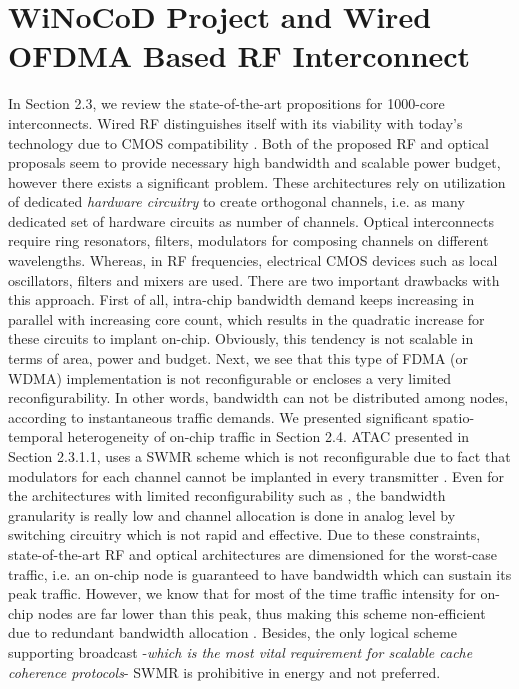 \chapter{WiNoCoD Project and Wired OFDMA Based RF Interconnect } %

\label{Chapter3} %


In Section 2.3, we review the state-of-the-art propositions for 1000-core interconnects. Wired RF distinguishes itself with its viability with today's technology due to CMOS compatibility \cite{chang2008cmp}. Both of the proposed RF and optical proposals seem to provide necessary high bandwidth and scalable power budget, however there exists a significant problem. These architectures rely on utilization of dedicated \textit{hardware circuitry} to create orthogonal channels, i.e. as many dedicated set of hardware circuits as number of channels. Optical interconnects require ring resonators, filters, modulators for composing channels on different wavelengths. Whereas, in RF frequencies, electrical CMOS devices such as local oscillators, filters and mixers are used. There are two important drawbacks with this approach. First of all, intra-chip bandwidth demand keeps increasing in parallel with increasing core count, which results in the quadratic increase for these circuits to implant on-chip. Obviously, this tendency is not scalable in terms of area, power and budget. Next, we see that this type of FDMA (or WDMA) implementation is not reconfigurable or encloses a very limited reconfigurability. In other words, bandwidth can not be distributed among nodes, according to instantaneous traffic demands. We presented significant spatio-temporal heterogeneity of on-chip traffic in Section 2.4. ATAC presented in Section 2.3.1.1, uses a SWMR scheme which is not reconfigurable due to fact that modulators for each channel cannot be implanted in every transmitter \cite{kurian2010atac}. Even for the architectures with limited reconfigurability such as \cite{chang2008cmp}, the bandwidth granularity is really low and channel allocation is done in analog level by switching circuitry which is not rapid and effective. Due to these constraints, state-of-the-art RF and optical architectures are dimensioned for the worst-case traffic, i.e. an on-chip node is guaranteed to have bandwidth which can sustain its peak traffic. However, we know that for most of the time traffic intensity for on-chip nodes are far lower than this peak, thus making this scheme non-efficient due to redundant bandwidth allocation \cite{soteriou2006statistical}. Besides, the only logical scheme supporting broadcast -\textit{which is the most vital requirement for scalable cache coherence protocols}- SWMR is prohibitive in energy and not preferred.


